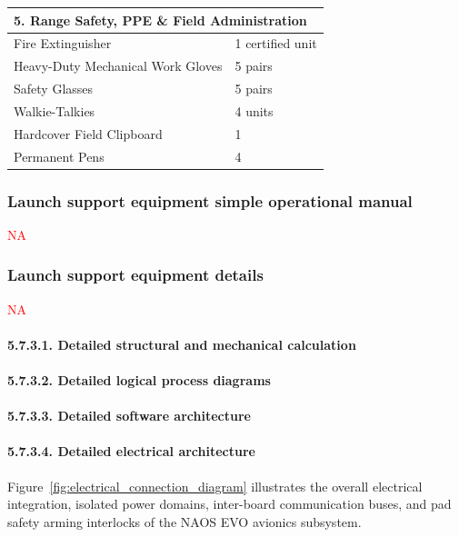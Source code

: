 \documentclass[11pt, a4paper]{article} %
\begin{document}
\begin{longtable}{p{} p{}}
\multicolumn{2}{l}{\textbf{5. Range Safety, PPE \& Field Administration}} \\
\midrule
Fire Extinguisher & 1 certified unit \\
Heavy-Duty Mechanical Work Gloves & 5 pairs \\
Safety Glasses & 5 pairs \\
Walkie-Talkies & 4 units \\
Hardcover Field Clipboard & 1 \\
Permanent Pens & 4 \\

\end{longtable}

\subsubsection{Launch support equipment simple operational manual} \textcolor{red}{ NA}
\subsubsection{Launch support equipment details} \textcolor{red}{NA}
\paragraph{5.7.3.1. Detailed structural and mechanical calculation}
\paragraph{5.7.3.2. Detailed logical process diagrams}
\paragraph{5.7.3.3. Detailed software architecture} 
\paragraph{5.7.3.4. Detailed electrical architecture}
\label{para:detailed_electrical_architecture}

Figure~\ref{fig:electrical_connection_diagram} illustrates the overall electrical integration, isolated power domains, inter-board communication buses, and pad safety arming interlocks of the NAOS EVO avionics subsystem.
\end{document}
